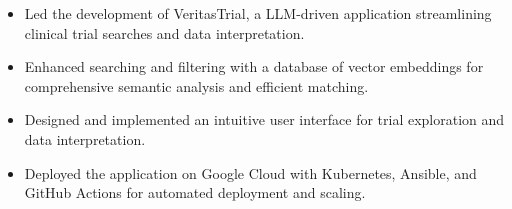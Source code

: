 


\begin{itemize}[nosep]
  \item Led the development of VeritasTrial, a LLM-driven application streamlining clinical trial searches and data interpretation.
  \item Enhanced searching and filtering with a database of vector embeddings for comprehensive semantic analysis and efficient matching.
  \item Designed and implemented an intuitive user interface for trial exploration and data interpretation.
  \item Deployed the application on Google Cloud with Kubernetes, Ansible, and GitHub Actions for automated deployment and scaling.
\end{itemize}
